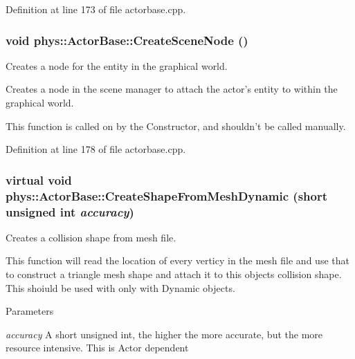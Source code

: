 Definition at line 173 of file actorbase.cpp.

\hypertarget{classphys_1_1ActorBase_a125d6f0a0b4072e64490638c074eea2d}{
\subsubsection[{CreateSceneNode}]{\setlength{\rightskip}{0pt plus 5cm}void phys::ActorBase::CreateSceneNode ()}}
\label{d8/d0f/classphys_1_1ActorBase_a125d6f0a0b4072e64490638c074eea2d}


Creates a node for the entity in the graphical world. 

Creates a node in the scene manager to attach the actor's entity to within the graphical world. \par
 This function is called on by the Constructor, and shouldn't be called manually. 

Definition at line 178 of file actorbase.cpp.

\hypertarget{classphys_1_1ActorBase_aa41370f6d2031a9dad8df45bd7f3bcc6}{
\subsubsection[{CreateShapeFromMeshDynamic}]{\setlength{\rightskip}{0pt plus 5cm}virtual void phys::ActorBase::CreateShapeFromMeshDynamic (short unsigned int {\em accuracy})}}
\label{d8/d0f/classphys_1_1ActorBase_aa41370f6d2031a9dad8df45bd7f3bcc6}


Creates a collision shape from mesh file. 

This function will read the location of every verticy in the mesh file and use that to construct a triangle mesh shape and attach it to this objects collision shape. This shoiuld be used with only with Dynamic objects. 
\begin{DoxyParams}{Parameters}
\item[{\em accuracy}]A short unsigned int, the higher the more accurate, but the more resource intensive. This is Actor dependent \end{DoxyParams}


